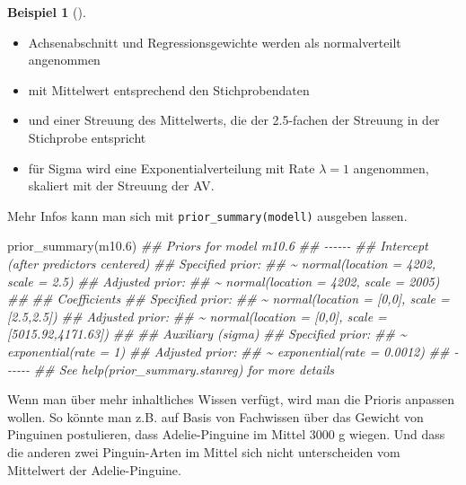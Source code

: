\documentclass[
  ngerman,
  letterpaper,
  twoside,
  open=any]{scrbook}
\newenvironment{Shaded}{\begin{snugshade}}{\end{snugshade}}
\newcommand{\DocumentationTok}[1]{\textcolor[rgb]{0.37,0.37,0.37}{\textit{#1}}}
\newcommand{\FloatTok}[1]{\textcolor[rgb]{0.68,0.00,0.00}{#1}}
\newcommand{\FunctionTok}[1]{\textcolor[rgb]{0.28,0.35,0.67}{#1}}
\newcommand{\NormalTok}[1]{\textcolor[rgb]{0.00,0.23,0.31}{#1}}
\providecommand{\tightlist}{%
  \setlength{\itemsep}{0pt}\setlength{\parskip}{0pt}}\usepackage{longtable,booktabs,array}
\theoremstyle{definition}
\newtheorem{example}{Beispiel}[chapter]
\theoremstyle{plain}
\theoremstyle{definition}
\theoremstyle{definition}
\theoremstyle{remark}
\begin{document}
\begin{example}[]
\begin{itemize}
\tightlist
\item
  Achsenabschnitt und Regressionsgewichte werden als normalverteilt
  angenommen
\item
  mit Mittelwert entsprechend den Stichprobendaten
\item
  und einer Streuung des Mittelwerts, die der 2.5-fachen der Streuung in
  der Stichprobe entspricht
\item
  für Sigma wird eine Exponentialverteilung mit Rate \(\lambda=1\)
  angenommen, skaliert mit der Streuung der AV.
\end{itemize}

Mehr Infos kann man sich mit \texttt{prior\_summary(modell)} ausgeben
lassen.

\begin{Shaded}
\begin{Highlighting}[]
\FunctionTok{prior\_summary}\NormalTok{(m10}\FloatTok{.6}\NormalTok{)}
\DocumentationTok{\#\# Priors for model \textquotesingle{}m10.6\textquotesingle{} }
\DocumentationTok{\#\# {-}{-}{-}{-}{-}{-}}
\DocumentationTok{\#\# Intercept (after predictors centered)}
\DocumentationTok{\#\#   Specified prior:}
\DocumentationTok{\#\#     \textasciitilde{} normal(location = 4202, scale = 2.5)}
\DocumentationTok{\#\#   Adjusted prior:}
\DocumentationTok{\#\#     \textasciitilde{} normal(location = 4202, scale = 2005)}
\DocumentationTok{\#\# }
\DocumentationTok{\#\# Coefficients}
\DocumentationTok{\#\#   Specified prior:}
\DocumentationTok{\#\#     \textasciitilde{} normal(location = [0,0], scale = [2.5,2.5])}
\DocumentationTok{\#\#   Adjusted prior:}
\DocumentationTok{\#\#     \textasciitilde{} normal(location = [0,0], scale = [5015.92,4171.63])}
\DocumentationTok{\#\# }
\DocumentationTok{\#\# Auxiliary (sigma)}
\DocumentationTok{\#\#   Specified prior:}
\DocumentationTok{\#\#     \textasciitilde{} exponential(rate = 1)}
\DocumentationTok{\#\#   Adjusted prior:}
\DocumentationTok{\#\#     \textasciitilde{} exponential(rate = 0.0012)}
\DocumentationTok{\#\# {-}{-}{-}{-}{-}{-}}
\DocumentationTok{\#\# See help(\textquotesingle{}prior\_summary.stanreg\textquotesingle{}) for more details}
\end{Highlighting}
\end{Shaded}

Wenn man über mehr inhaltliches Wissen verfügt, wird man die Prioris
anpassen wollen. So könnte man z.B. auf Basis von Fachwissen über das
Gewicht von Pinguinen postulieren, dass Adelie-Pinguine im Mittel 3000 g
wiegen. Und dass die anderen zwei Pinguin-Arten im Mittel sich nicht
unterscheiden vom Mittelwert der Adelie-Pinguine.


\end{example}
\end{document}
